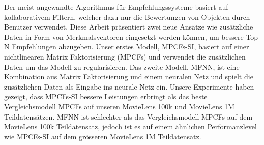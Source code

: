 \begin{zusammenfassung}
Der meist angewandte Algorithmus für Empfehlungssysteme basiert auf kollaborativem Filtern, welcher dazu nur die Bewertungen von Objekten durch Benutzer verwendet.
Diese Arbeit präsentiert zwei neue Ansätze wie zusätzliche Daten in Form von Merkmalsvektoren eingesetzt werden können, um bessere Top-N Empfehlungen abzugeben.
Unser erstes Modell, MPCFs-SI, basiert auf einer nichtlinearen Matrix Faktorisierung (MPCFs) und verwendet die zusätzlichen Daten um das Modell zu regularisieren.
Das zweite Modell, MFNN, ist eine Kombination aus Matrix Faktorisierung und einem neuralen Netz und spielt die zusätzlichen Daten als Eingabe ins neurale Netz ein.
Unsere Experimente haben gezeigt, dass MPCFs-SI bessere Leistungen erbringt als das beste Vergleichsmodell MPCFs auf unseren MovieLens 100k und MovieLens 1M Teildatensätzen.
MFNN ist schlechter als das Vergleichsmodell MPCFs auf dem MovieLens 100k Teildatensatz, jedoch ist es auf einem ähnlichen Performanzlevel wie MPCFs-SI auf dem grösseren MovieLens 1M Teildatensatz.
\end{zusammenfassung}
